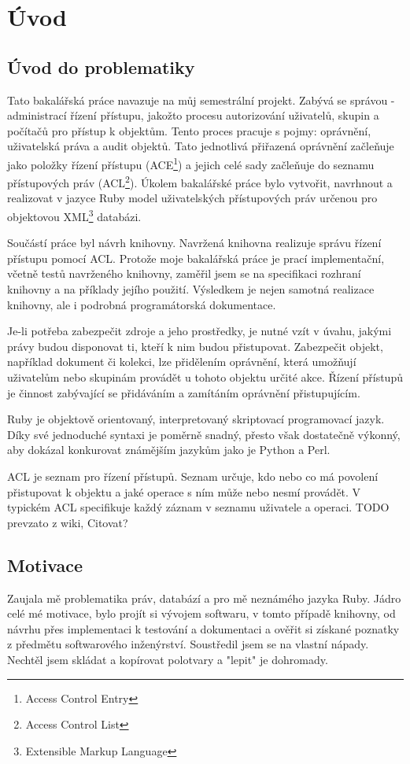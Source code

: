 \chapter{Úvod}

\section{Úvod do problematiky}

Tato bakalářská práce navazuje na můj semestrální projekt. Zabývá se správou - administrací řízení přístupu, jakožto procesu autorizování uživatelů, skupin a počítačů pro přístup k objektům. Tento proces pracuje s pojmy: oprávnění, uživatelská práva a audit objektů. Tato jednotlivá přiřazená oprávnění začleňuje jako položky řízení přístupu (ACE\footnote[1]{Access Control Entry}) a jejich celé sady začleňuje do seznamu přístupových práv (ACL\footnote[2]{Access Control List}). Úkolem bakalářské práce bylo vytvořit, navrhnout a realizovat v jazyce Ruby model uživatelských přístupových práv určenou pro objektovou XML\footnote[3]{Extensible Markup Language} databázi.

Součástí práce byl návrh knihovny. Navržená knihovna realizuje správu řízení přístupu pomocí ACL. Protože moje bakalářská práce je prací implementační, včetně testů navrženého knihovny, zaměřil jsem se na specifikaci rozhraní knihovny a na příklady jejího použití. Výsledkem je nejen samotná realizace knihovny, ale i podrobná programátorská dokumentace.

Je-li potřeba zabezpečit zdroje a jeho prostředky, je nutné vzít v úvahu, jakými právy budou disponovat ti, kteří k nim budou přistupovat. Zabezpečit objekt, například dokument či kolekci, lze přidělením oprávnění, která umožňují uživatelům nebo skupinám provádět u tohoto objektu určité akce. Řízení přístupů je činnost zabývající se přidáváním a zamítáním oprávnění přistupujícím.

Ruby je objektově orientovaný, interpretovaný skriptovací programovací jazyk. Díky své jednoduché syntaxi je poměrně snadný, přesto však dostatečně výkonný, aby dokázal konkurovat známějším jazykům jako je Python a Perl. 

ACL je seznam pro řízení přístupů. Seznam určuje, kdo nebo co má povolení přistupovat k objektu a jaké operace s ním může nebo nesmí provádět. V typickém ACL specifikuje každý záznam v seznamu uživatele a operaci. TODO prevzato z wiki, Citovat?


\section{Motivace}
Zaujala mě problematika práv, databází a pro mě neznámého jazyka Ruby.
Jádro celé mé motivace, bylo projít si vývojem softwaru, v tomto případě knihovny, od návrhu přes implementaci k testování a dokumentaci a ověřit si získané poznatky z předmětu softwarového inženýrství. Soustředil jsem se na vlastní nápady. Nechtěl jsem skládat a kopírovat polotvary a "lepit" je dohromady.